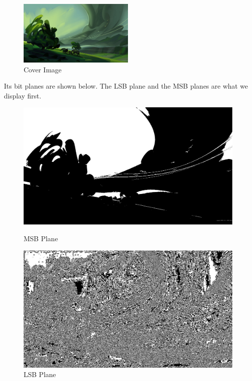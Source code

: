 \documentclass{report}
\begin{document}
\begin{figure}[H]
\centering
\includegraphics[width=0.5\textwidth]{images/desktop.jpg}
\caption{Cover Image}
\end{figure}
Its bit planes are shown below. The LSB plane and the MSB planes are what we display first.
\begin{figure}[H]
\centering
\begin{minipage}{0.46\linewidth}
\includegraphics[width=\textwidth]{images/plane1.png}
\caption{MSB Plane}
\end{minipage}
\hfill
\begin{minipage}{0.46\linewidth}
\includegraphics[width=\textwidth]{images/plane8.png}
\caption{LSB Plane}
\end{minipage}
\end{figure}
\end{document}
